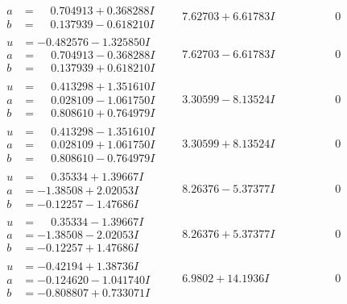 \documentclass[1p]{elsarticle_modified}
\theoremstyle{definition}
\begin{document}
$$\begin{array}{c|c|c}
\begin{aligned}
a &= \phantom{-}0.704913 + 0.368288 I \\
b &= \phantom{-}0.137939 - 0.618210 I\end{aligned}
 & \phantom{-}7.62703 + 6.61783 I & \phantom{-0.000000 } 0 \\ \hline\begin{aligned}
u &= -0.482576 - 1.325850 I \\
a &= \phantom{-}0.704913 - 0.368288 I \\
b &= \phantom{-}0.137939 + 0.618210 I\end{aligned}
 & \phantom{-}7.62703 - 6.61783 I & \phantom{-0.000000 } 0 \\ \hline\begin{aligned}
u &= \phantom{-}0.413298 + 1.351610 I \\
a &= \phantom{-}0.028109 - 1.061750 I \\
b &= \phantom{-}0.808610 + 0.764979 I\end{aligned}
 & \phantom{-}3.30599 - 8.13524 I & \phantom{-0.000000 } 0 \\ \hline\begin{aligned}
u &= \phantom{-}0.413298 - 1.351610 I \\
a &= \phantom{-}0.028109 + 1.061750 I \\
b &= \phantom{-}0.808610 - 0.764979 I\end{aligned}
 & \phantom{-}3.30599 + 8.13524 I & \phantom{-0.000000 } 0 \\ \hline\begin{aligned}
u &= \phantom{-}0.35334 + 1.39667 I \\
a &= -1.38508 + 2.02053 I \\
b &= -0.12257 - 1.47686 I\end{aligned}
 & \phantom{-}8.26376 - 5.37377 I & \phantom{-0.000000 } 0 \\ \hline\begin{aligned}
u &= \phantom{-}0.35334 - 1.39667 I \\
a &= -1.38508 - 2.02053 I \\
b &= -0.12257 + 1.47686 I\end{aligned}
 & \phantom{-}8.26376 + 5.37377 I & \phantom{-0.000000 } 0 \\ \hline\begin{aligned}
u &= -0.42194 + 1.38736 I \\
a &= -0.124620 - 1.041740 I \\
b &= -0.808807 + 0.733071 I\end{aligned}
 & \phantom{-}6.9802 + 14.1936 I & \phantom{-0.000000 } 0 \\ \hline\begin{aligned}

\end{aligned}
\end{array}$$
\end{document}
